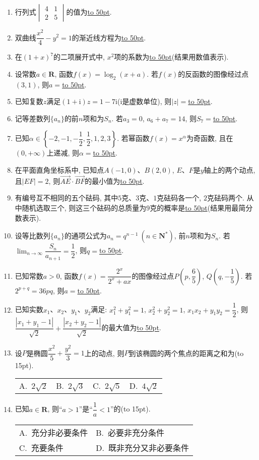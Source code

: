 \documentclass[10pt,a4paper]{article}
\newcommand{\blank}[1]{\underline{\hbox to #1pt{}}}
\newcommand{\bracket}[1]{(\hbox to #1pt{})}
\newcommand{\twoch}[4]{\par\begin{tabular}{p{.46\textwidth}p{.46\textwidth}}
A.~#1& B.~#2\\
C.~#3& D.~#4
\end{tabular}}
\newcommand{\fourch}[4]{\par\begin{tabular}{p{.23\textwidth}p{.23\textwidth}p{.23\textwidth}p{.23\textwidth}}
A.~#1 &B.~#2& C.~#3& D.~#4
\end{tabular}}
\begin{document}
\begin{enumerate}[1.]
\item 行列式$\begin{vmatrix}
4 & 1 \\ 2 & 5
\end{vmatrix}$的值为\blank{50}.
\item 双曲线$\dfrac{x^2}{4}-y^2=1$的渐近线方程为\blank{50}.
\item 在$(1+x)^7$的二项展开式中, $x^2$项的系数为\blank{50}(结果用数值表示).
\item 设常数$a\in \mathbf{R}$, 函数$f(x)=\log_2(x+a)$. 若$f(x)$的反函数的图像经过点$(3,1)$, 则$a=$\blank{50}.
\item 已知复数$z$满足$(1+\mathrm{i})z=1-7\mathrm{i}$($\mathrm{i}$是虚数单位), 则$|z|=$\blank{50}.
\item 记等差数列$\{a_n\}$的前$n$项和为$S_n$. 若$a_3=0$, $a_6+a_7=14$, 则$S_7=$\blank{50}.
\item 已知$\alpha\in \left\{-2,-1,-\dfrac{1}{2},\dfrac{1}{2},1,2,3\right\}$. 若幂函数$f(x)=x^{\alpha}$为奇函数, 且在$(0,+\infty)$上递减, 则$\alpha=$\blank{50}.
\item 在平面直角坐标系中, 已知点$A(-1,0)$、$B(2,0)$, $E$、$F$是$y$轴上的两个动点, 且$|EF|=2$, 则$\overrightarrow{AE}\cdot \overrightarrow{BF}$的最小值为\blank{50}.
\item 有编号互不相同的五个砝码, 其中$5$克、$3$克、$1$克砝码各一个, $2$克砝码两个. 从中随机选取三个, 则这三个砝码的总质量为$9$克的概率是\blank{50}(结果用最简分数表示).
\item 设等比数列$\{a_n\}$的通项公式为$a_n=q^{n-1} \ (n\in \mathbf{N}^*)$, 前$n$项和为$S_n$. 若$\displaystyle\lim_{n\to \infty}\dfrac{S_n}{a_{n+1}}=\dfrac{1}{2}$, 则$q=$\blank{50}.
\item 已知常数$a>0$, 函数$f(x)=\dfrac{2^x}{2^x+ax}$的图像经过点$P\left(p,\dfrac{6}{5}\right)$, $Q\left(q,-\dfrac{1}{5}\right)$. 若$2^{p+q}=36pq$, 则$a=$\blank{50}.
\item 已知实数$x_1$、$x_2$、$y_1$、$y_2$满足: $x_1^2+y_1^2=1$, $x_2^2+y_2^2=1$, $x_1x_2+y_1y_2=\dfrac{1}{2}$, 则$\dfrac{|x_1+y_1-1|}{\sqrt{2}}+\dfrac{|x_2+y_2-1|}{\sqrt{2}}$的最大值为\blank{50}.
\item 设$P$是椭圆$\dfrac{x^2}{5}+\dfrac{y^2}{3}=1$上的动点, 则$P$到该椭圆的两个焦点的距离之和为\bracket{15}.
\fourch{$2\sqrt{2}$}{$2\sqrt{3}$}{$2\sqrt{5}$}{$4\sqrt{2}$}
\item 已知$a\in \mathbf{R}$, 则``$a>1$''是``$\dfrac{1}{a}<1$''的\bracket{15}.
\twoch{充分非必要条件}{必要非充分条件}{充要条件}{既非充分又非必要条件}

\end{enumerate}
\end{document}
